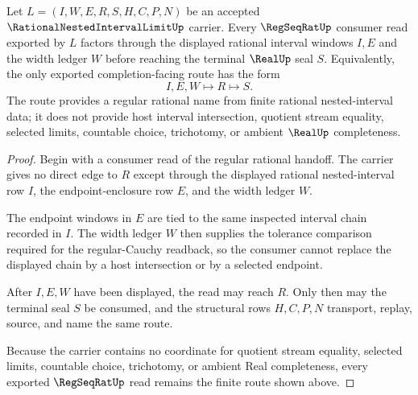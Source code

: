 \begin{theorem}
\label{thm:rational-nested-interval-limit-regseqrat-handoff}
Let $L=(I,W,E,R,S,H,C,P,N)$ be an accepted $\RationalNestedIntervalLimitUp$ carrier. Every $\RegSeqRatUp$ consumer read exported by $L$ factors through the displayed rational interval windows $I,E$ and the width ledger $W$ before reaching the terminal $\RealUp$ seal $S$. Equivalently, the only exported completion-facing route has the form
$$
I,E,W \longmapsto R \longmapsto S .
$$
The route provides a regular rational name from finite rational nested-interval data; it does not provide host interval intersection, quotient stream equality, selected limits, countable choice, trichotomy, or ambient $\RealUp$ completeness.
\end{theorem}
\begin{proof}
Begin with a consumer read of the regular rational handoff. The carrier gives no direct edge to $R$ except through the displayed rational nested-interval row $I$, the endpoint-enclosure row $E$, and the width ledger $W$.

The endpoint windows in $E$ are tied to the same inspected interval chain recorded in $I$. The width ledger $W$ then supplies the tolerance comparison required for the regular-Cauchy readback, so the consumer cannot replace the displayed chain by a host intersection or by a selected endpoint.

After $I,E,W$ have been displayed, the read may reach $R$. Only then may the terminal seal $S$ be consumed, and the structural rows $H,C,P,N$ transport, replay, source, and name the same route.

Because the carrier contains no coordinate for quotient stream equality, selected limits, countable choice, trichotomy, or ambient Real completeness, every exported $\RegSeqRatUp$ read remains the finite route shown above.
\end{proof}

